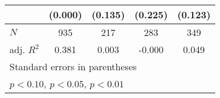 {\begin{tabular}{l*{4}{c}}
            &     (0.000)         &     (0.135)         &     (0.225)         &     (0.123)         \\
\hline
\(N\)       &         935         &         217         &         283         &         349         \\
adj. \(R^{2}\)&       0.381         &       0.003         &      -0.000         &       0.049         \\
\hline\hline
\multicolumn{5}{l}{\footnotesize Standard errors in parentheses}\\
\multicolumn{5}{l}{\footnotesize \sym{*} \(p<0.10\), \sym{**} \(p<0.05\), \sym{***} \(p<0.01\)}\\
\end{tabular}
}
